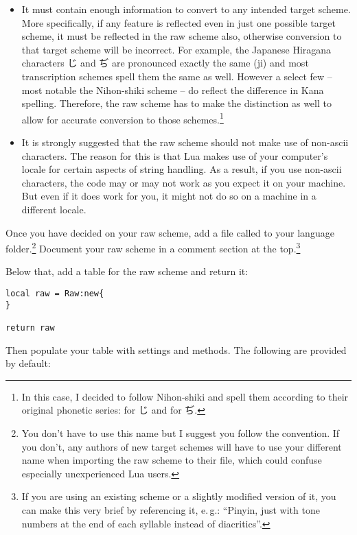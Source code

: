 \documentclass{ltxdockit}
\begin{document}
\begin{itemize}
  \item It must contain enough information to convert to any intended target
    scheme. More specifically, if any feature is reflected even in just one
    possible target scheme, it must be reflected in the raw scheme also,
    otherwise conversion to that target scheme will be incorrect. For example,
    the Japanese Hiragana characters じ and ぢ are pronounced exactly the same
    (ji) and most transcription schemes spell them the same as well. However
    a select few -- most notable the Nihon-shiki scheme -- do reflect the
    difference in Kana spelling. Therefore, the raw scheme has to make the
    distinction as well to allow for accurate conversion to those
    schemes.\footnote{In this case, I decided to follow Nihon-shiki and spell
    them according to their original phonetic series:  for じ and
     for ぢ.}
  \item It is strongly suggested that the raw scheme should not make use of
    non-ascii characters. The reason for this is that Lua makes use of your
    computer's locale for certain aspects of string handling. As a result, if you
    use non-ascii characters, the code may or may not work as you expect it on
    your machine. But even if it does work for you, it might not do so on
    a machine in a different locale.
\end{itemize}

Once you have decided on your raw scheme, add a file called  to
your language folder.\footnote{You don't have to use this name but I suggest
you follow the convention. If you don't, any authors of new target schemes
will have to use your different name when importing the raw scheme to their
file, which could confuse especially unexperienced Lua users.} Document your raw
scheme in a comment section at the top.\footnote{If you are using an existing
scheme or a slightly modified version of it, you can make this very brief by
referencing it, e.\,g.: \enquote{Pinyin, just with tone numbers at the end of
each syllable instead of diacritics}.}

Below that, add a table for the raw scheme and return it:

\begin{lstlisting}
local raw = Raw:new{
}

return raw
\end{lstlisting}

Then populate your table with settings and methods. The following are provided
by default:
\end{document}
